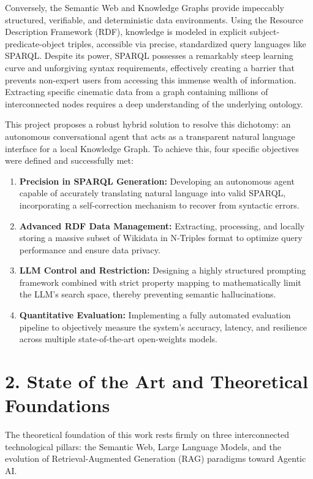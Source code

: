 Conversely, the Semantic Web and Knowledge Graphs provide impeccably structured, verifiable, and deterministic data environments. Using the Resource Description Framework (RDF), knowledge is modeled in explicit subject-predicate-object triples, accessible via precise, standardized query languages like SPARQL. Despite its power, SPARQL possesses a remarkably steep learning curve and unforgiving syntax requirements, effectively creating a barrier that prevents non-expert users from accessing this immense wealth of information. Extracting specific cinematic data from a graph containing millions of interconnected nodes requires a deep understanding of the underlying ontology.

This project proposes a robust hybrid solution to resolve this dichotomy: an autonomous conversational agent that acts as a transparent natural language interface for a local Knowledge Graph. To achieve this, four specific objectives were defined and successfully met:
\begin{enumerate}
    \item \textbf{Precision in SPARQL Generation:} Developing an autonomous agent capable of accurately translating natural language into valid SPARQL, incorporating a self-correction mechanism to recover from syntactic errors.
    \item \textbf{Advanced RDF Data Management:} Extracting, processing, and locally storing a massive subset of Wikidata in N-Triples format to optimize query performance and ensure data privacy.
    \item \textbf{LLM Control and Restriction:} Designing a highly structured prompting framework combined with strict property mapping to mathematically limit the LLM's search space, thereby preventing semantic hallucinations.
    \item \textbf{Quantitative Evaluation:} Implementing a fully automated evaluation pipeline to objectively measure the system's accuracy, latency, and resilience across multiple state-of-the-art open-weights models.
\end{enumerate}

\section*{2. State of the Art and Theoretical Foundations}

The theoretical foundation of this work rests firmly on three interconnected technological pillars: the Semantic Web, Large Language Models, and the evolution of Retrieval-Augmented Generation (RAG) paradigms toward Agentic AI.

